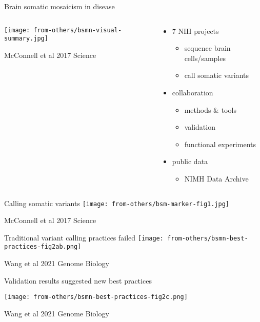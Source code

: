 \documentclass[usenames,dvipsnames]{beamer}
\begin{document}
\begin{frame}{Brain somatic mosaicism in disease}
\begin{columns}[t]
\begin{column}{0.6\textwidth}

\texttt{[image: from-others/bsmn-visual-summary.jpg]}

{\tiny McConnell et al 2017 Science}
\end{column}

\begin{column}{0.4\textwidth}
\begin{itemize}
\item 7 NIH projects
	\begin{itemize}
	\item sequence brain cells/samples
	\item call somatic variants
	\end{itemize}
\item collaboration
	\begin{itemize}
	\item methods \& tools 
        \item validation
        \item functional experiments
	\end{itemize}
\item public data
	\begin{itemize}
		\item NIMH Data Archive
	\end{itemize}
\end{itemize}
\end{column}
\end{columns}
\end{frame}

\begin{frame}{Calling somatic variants}
\texttt{[image: from-others/bsm-marker-fig1.jpg]}

{\tiny McConnell et al 2017 Science}
\end{frame}

\begin{frame}{Traditional variant calling practices failed}
\texttt{[image: from-others/bsmn-best-practices-fig2ab.png]}

{\tiny Wang et al 2021 Genome Biology}
\end{frame}

\begin{frame}{Validation results suggested new best practices}
\begin{center}
\texttt{[image: from-others/bsmn-best-practices-fig2c.png]}
\end{center}

{\tiny Wang et al 2021 Genome Biology}
\end{frame}
\end{document}
